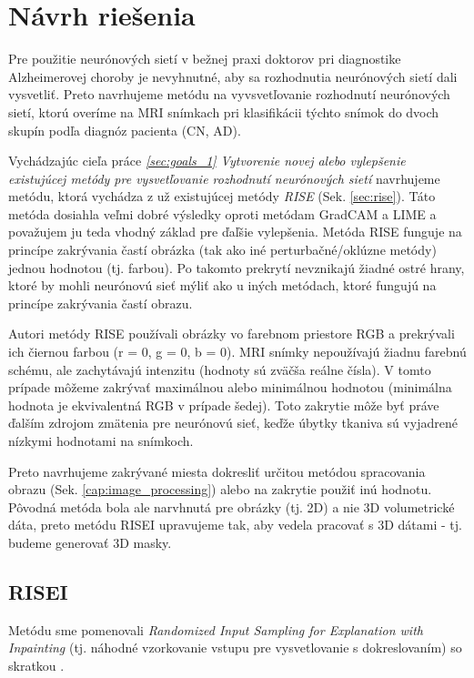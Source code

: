\chapter{Návrh riešenia}

Pre použitie neurónových sietí v bežnej praxi doktorov pri diagnostike Alzheimerovej choroby je nevyhnutné, aby sa rozhodnutia neurónových sietí dali vysvetliť. Preto navrhujeme metódu na vyvsvetľovanie rozhodnutí neurónových sietí, ktorú overíme na MRI snímkach pri klasifikácii týchto snímok do dvoch skupín podľa diagnóz pacienta (CN, AD).

Vychádzajúc cieľa práce \textit{\ref{sec:goals_1} Vytvorenie novej alebo vylepšenie existujúcej metódy pre vysvetľovanie rozhodnutí neurónových sietí} navrhujeme metódu, ktorá vychádza z už existujúcej metódy \textit{RISE} (Sek. \ref{sec:rise}). Táto metóda dosiahla veľmi dobré výsledky oproti metódam GradCAM a LIME a považujem ju teda vhodný základ pre ďaľšie vylepšenia. Metóda RISE funguje na princípe zakrývania častí obrázka (tak ako iné perturbačné/oklúzne metódy) jednou hodnotou (tj. farbou). Po takomto prekrytí nevznikajú žiadné ostré hrany, ktoré by mohli neurónovú sieť mýliť ako u iných metódach, ktoré fungujú na princípe zakrývania častí obrazu.

Autori metódy RISE používali obrázky vo farebnom priestore RGB a prekrývali ich čiernou farbou (r = 0, g = 0, b = 0). MRI snímky nepoužívajú žiadnu farebnú schému, ale zachytávajú intenzitu (hodnoty sú zväčša reálne čísla). V tomto prípade môžeme zakrývať maximálnou alebo minimálnou hodnotou (minimálna hodnota je ekvivalentná RGB v prípade šedej). Toto zakrytie môže byť práve ďalším zdrojom zmätenia pre neurónovú sieť, keďže úbytky tkaniva sú vyjadrené nízkymi hodnotami na snímkoch.

Preto navrhujeme zakrývané miesta dokresliť určitou metódou spracovania obrazu (Sek. \ref{cap:image_processing}) alebo na zakrytie použiť inú hodnotu.
Pôvodná metóda bola ale narvhnutá pre obrázky (tj. 2D) a nie 3D volumetrické dáta, preto metódu RISEI upravujeme tak, aby vedela pracovať s 3D dátami - tj. budeme generovať 3D masky.

\section{RISEI \label{sec:risei}}

Metódu sme pomenovali \textit{Randomized Input Sampling for Explanation with Inpainting} (tj. náhodné vzorkovanie vstupu pre vysvetlovanie s dokreslovaním) so skratkou .

